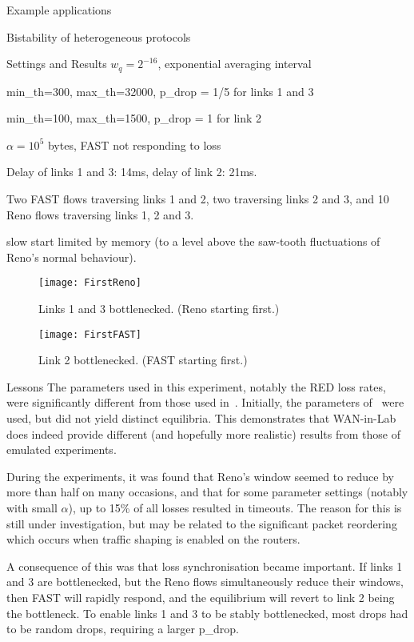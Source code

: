 \documentclass{IEEEtran}
\begin{document}
\begin{section}{Example applications}
\begin{subsection}{Bistability of heterogeneous protocols}
\begin{subsubsection}{Settings and Results}
$w_q=2^{-16}$, exponential averaging interval

min\_th=300, max\_th=32000, p\_drop = 1/5  for links 1 and 3

min\_th=100, max\_th=1500, p\_drop = 1  for link 2

$\alpha = 10^5$ bytes, FAST not responding to loss

Delay of links 1 and 3: 14ms, delay of link 2: 21ms.

Two FAST flows traversing links 1 and 2, two traversing links 2 and 3, and 10
Reno flows traversing links 1, 2 and 3.

slow start limited by memory (to a level above the saw-tooth fluctuations of
Reno's normal behaviour).

\begin{figure}
    \texttt{[image: FirstReno]}
    \caption{Links 1 and 3 bottlenecked.  (Reno starting first.)}
    \label{f.RenoFirst}
\end{figure}
\begin{figure}
    \texttt{[image: FirstFAST]}
    \caption{Link 2 bottlenecked.  (FAST starting first.)}
    \label{f.FASTFirst}
\end{figure}
\end{subsubsection}

\begin{subsubsection}{Lessons}
The parameters used in this experiment, notably the RED loss rates, were
significantly different from those used in~\cite{Heterogeneous}.  Initially,
the parameters of~\cite{Heterogeneous} were used, but did not yield distinct
equilibria.  This demonstrates that WAN-in-Lab does indeed provide different
(and hopefully more realistic) results from those of emulated experiments.

During the experiments, it was found that Reno's window seemed to reduce by more
than half on many occasions, and that for some parameter settings (notably with
small $\alpha$), up to 15\% of all losses resulted in timeouts.  The reason for
this is still under investigation, but may be related to the significant
packet reordering which occurs when traffic shaping is enabled on the routers.

A consequence of this was that loss synchronisation became important.  If links
1 and 3 are bottlenecked, but the Reno flows simultaneously reduce their
windows, then FAST will rapidly respond, and the equilibrium will revert to
link 2 being the bottleneck.  To enable links 1 and 3 to be stably
bottlenecked, most drops had to be random drops, requiring a larger p\_drop.


\end{subsubsection}
\end{subsection}
\end{section}
\end{document}

